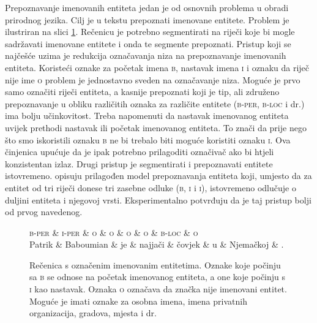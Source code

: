 Prepoznavanje imenovanih entiteta  jedan je od
osnovnih problema u obradi prirodnog jezika. Cilj je u tekstu prepoznati
imenovane entitete. Problem je ilustriran na slici
\ref{fig:namedentityrecognition}. Rečenicu je potrebno segmentirati na riječi
koje bi mogle sadržavati imenovane entitete i onda te segmente prepoznati.
Pristup koji se najčešće uzima je redukcija označavanja niza na prepoznavanje
imenovanih entiteta. Koristeći oznake za početak imena \textsc{b}, nastavak
imena \textsc{i} i oznaku da riječ nije ime \textsc{o} problem je jednostavno
sveden na označavanje niza. Moguće je prvo samo označiti riječi entiteta, a
kasnije prepoznati koji je tip, ali združeno prepoznavanje u obliku različitih
oznaka za različite entitete (\textsc{b-per}, \textsc{b-loc} i dr.) ima bolju
učinkovitost. Treba napomenuti da nastavak imenovanog entiteta uvijek prethodi
nastavak ili početak imenovanog entiteta. To znači da prije nego što smo
iskoristili oznaku \textsc{b} ne bi trebalo biti moguće koristiti oznaku
\textsc{i}. Ova činjenica upućuje da je ipak potrebno prilagoditi označivač ako
bi htjeli konzistentan izlaz. Drugi pristup je segmentirati i prepoznavati
entitete istovremeno. \citet{sarawagi2004semi} opisuju prilagođen model
prepoznavanja entiteta koji, umjesto da za entitet od tri riječi donese tri
zasebne odluke (\textsc{b}, \textsc{i} i \textsc{i}), istovremeno odlučuje o
duljini entiteta i njegovoj vrsti. Eksperimentalno potvrđuju da je taj pristup
bolji od prvog navedenog.

\begin{figure}[H]
\centering
\begin{dependency}
\begin{deptext}
  \textsc{b-per} \& \textsc{i-per} \& \textsc{o} \& \textsc{o} \& \textsc{o} \& \textsc{o} \& \textsc{b-loc} \& \textsc{o} \\
  Patrik         \& Baboumian      \& je         \& najjači    \& čovjek     \& u          \& Njemačkoj      \& .          \\
\end{deptext}
\end{dependency}
\caption[Rečenica s označenim imenovanim entitetima.]{Rečenica s označenim
imenovanim entitetima. Oznake koje počinju sa \textsc{b} se odnose na početak
imenovanog entiteta, a one koje počinju s \textsc{i} kao nastavak. Oznaka
\textsc{o} označava da značka nije imenovani entitet. Moguće je imati oznake za
osobna imena, imena privatnih organizacija, gradova, mjesta i dr.}
\label{fig:namedentityrecognition}
\end{figure}

